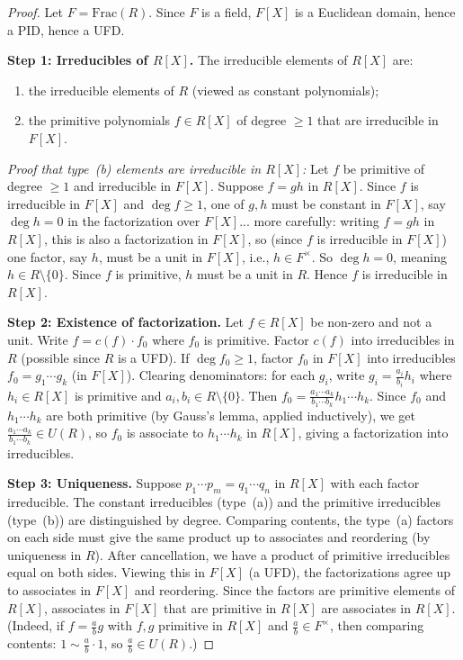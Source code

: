 \documentclass[12pt,a4paper,openany]{book}
\theoremstyle{definition}
\theoremstyle{remark}
\begin{document}
\begin{proof}
Let $F=\mathrm{Frac}(R)$. Since $F$ is a field, $F[X]$ is a Euclidean domain, hence a PID, hence a UFD.

\textbf{Step 1: Irreducibles of $R[X]$.} The irreducible elements of $R[X]$ are:
\begin{enumerate}[label=(\alph*)]
    \item the irreducible elements of $R$ (viewed as constant polynomials);
    \item the primitive polynomials $f\in R[X]$ of degree $\geq 1$ that are irreducible in $F[X]$.
\end{enumerate}

\emph{Proof that type~(b) elements are irreducible in $R[X]$:} Let $f$ be primitive of degree $\geq 1$ and irreducible in $F[X]$. Suppose $f=gh$ in $R[X]$. Since $f$ is irreducible in $F[X]$ and $\deg f\geq 1$, one of $g,h$ must be constant in $F[X]$, say $\deg h=0$ in the factorization over $F[X]$... more carefully: writing $f=gh$ in $R[X]$, this is also a factorization in $F[X]$, so (since $f$ is irreducible in $F[X]$) one factor, say $h$, must be a unit in $F[X]$, i.e., $h\in F^{\times}$. So $\deg h=0$, meaning $h\in R\setminus\{0\}$. Since $f$ is primitive, $h$ must be a unit in $R$. Hence $f$ is irreducible in $R[X]$.

\textbf{Step 2: Existence of factorization.} Let $f\in R[X]$ be non-zero and not a unit. Write $f=c(f)\cdot f_0$ where $f_0$ is primitive. Factor $c(f)$ into irreducibles in $R$ (possible since $R$ is a UFD). If $\deg f_0\geq 1$, factor $f_0$ in $F[X]$ into irreducibles $f_0=g_1\cdots g_k$ (in $F[X]$). Clearing denominators: for each $g_i$, write $g_i=\frac{a_i}{b_i}h_i$ where $h_i\in R[X]$ is primitive and $a_i,b_i\in R\setminus\{0\}$. Then $f_0=\frac{a_1\cdots a_k}{b_1\cdots b_k}h_1\cdots h_k$. Since $f_0$ and $h_1\cdots h_k$ are both primitive (by Gauss's lemma, applied inductively), we get $\frac{a_1\cdots a_k}{b_1\cdots b_k}\in U(R)$, so $f_0$ is associate to $h_1\cdots h_k$ in $R[X]$, giving a factorization into irreducibles.

\textbf{Step 3: Uniqueness.} Suppose $p_1\cdots p_m=q_1\cdots q_n$ in $R[X]$ with each factor irreducible. The constant irreducibles (type~(a)) and the primitive irreducibles (type~(b)) are distinguished by degree. Comparing contents, the type~(a) factors on each side must give the same product up to associates and reordering (by uniqueness in $R$). After cancellation, we have a product of primitive irreducibles equal on both sides. Viewing this in $F[X]$ (a UFD), the factorizations agree up to associates in $F[X]$ and reordering. Since the factors are primitive elements of $R[X]$, associates in $F[X]$ that are primitive in $R[X]$ are associates in $R[X]$. (Indeed, if $f=\frac{a}{b}g$ with $f,g$ primitive in $R[X]$ and $\frac{a}{b}\in F^{\times}$, then comparing contents: $1\sim\frac{a}{b}\cdot 1$, so $\frac{a}{b}\in U(R)$.)
\end{proof}
\end{document}
